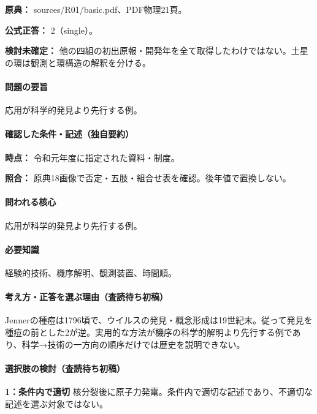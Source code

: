 \noindent\textbf{原典：} sources/R01/basic.pdf、PDF物理21頁。

\textbf{公式正答：} 2（single）。

\par\textbf{検討未確定：} 他の四組の初出原報・開発年を全て取得したわけではない。土星の環は観測と環構造の解釈を分ける。

\paragraph{問題の要旨} 応用が科学的発見より先行する例。

\paragraph{確認した条件・記述（独自要約）}\mbox{}\par

\noindent\textbf{時点：} 令和元年度に指定された資料・制度。\par

\noindent\textbf{照合：} 原典18画像で否定・五肢・組合せ表を確認。後年値で置換しない。\par

\paragraph{問われる核心} 応用が科学的発見より先行する例。

\paragraph{必要知識} 経験的技術、機序解明、観測装置、時間順。

\paragraph{考え方・正答を選ぶ理由（査読待ち初稿）} Jennerの種痘は1796頃で、ウイルスの発見・概念形成は19世紀末。従って発見を種痘の前とした2が逆。実用的な方法が機序の科学的解明より先行する例であり、科学→技術の一方向の順序だけでは歴史を説明できない。

\paragraph{選択肢の検討（査読待ち初稿）}\mbox{}\par

\noindent\textbf{1：条件内で適切} 核分裂後に原子力発電。条件内で適切な記述であり、不適切な記述を選ぶ対象ではない。\par

